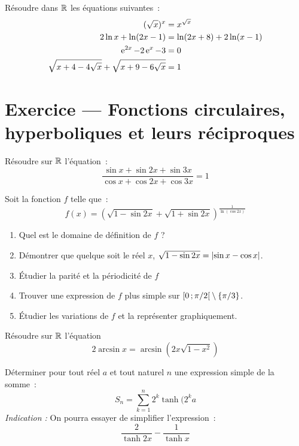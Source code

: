 \begin{exercice}
    Résoudre dans \(\mathbb{R}\) les équations suivantes~:
    \begin{align}
        (\sqrt{x})^x &= x^{\sqrt{x}} \\
        2\ln x + \ln(2x-1) &= \ln(2x+8) + 2\ln(x-1) \\
        \operatorname{e}^{2x} -2\operatorname{e}^x-3 &=0 \\
        \sqrt{x+4-4\sqrt{x}} + \sqrt{x+9-6\sqrt{x}} &= 1
    \end{align}
\end{exercice}
\section{Exercice --- Fonctions circulaires, hyperboliques et leurs réciproques}
\begin{exercice}
    Résoudre sur \(\mathbb{R}\) l'équation~:
    \begin{equation}
        \frac{\sin x + \sin 2x + \sin 3x}{\cos x + \cos 2x + \cos 3x} = 1
    \end{equation}
\end{exercice}
\begin{exercice}
    Soit la fonction \(f\) telle que~:
    \begin{equation}
        f(x) = (\sqrt{1-\sin 2x}+\sqrt{1+\sin 2x})^{\frac{1}{\ln(\cos 2x)}}
    \end{equation}
    \begin{enumerate}
        \item Quel est le domaine de définition de \(f\) ?
        \item Démontrer que quelque soit le réel \(x\), \(\sqrt{1-\sin 2x}=\left\lvert\sin x - \cos x\right\rvert\).
        \item Étudier la parité et la périodicité de \(f\)
        \item Trouver une expression de \(f\) plus simple sur \(\left[ 0 \, ;  \pi/2 \right[\setminus\{\pi/3\}\).
        \item Étudier les variations de \(f\) et la représenter graphiquement.
    \end{enumerate}
\end{exercice}
\begin{exercice}
    Résoudre sur \(\mathbb{R}\) l'équation
    \begin{equation}
        2\arcsin x = \arcsin(2x\sqrt{1-x^2})
    \end{equation}
\end{exercice}
\begin{exercice}
    Déterminer pour tout réel \(a\) et tout naturel \(n\) une expression simple de la somme~:
    \begin{equation}
        S_n = \sum_{k=1}^n 2^k \tanh(2^k a
    \end{equation}
    \emph{Indication :} On pourra essayer de simplifier l'expression~:
    \[\frac{2}{\tanh 2x} - \frac{1}{\tanh x}\]
\end{exercice}
